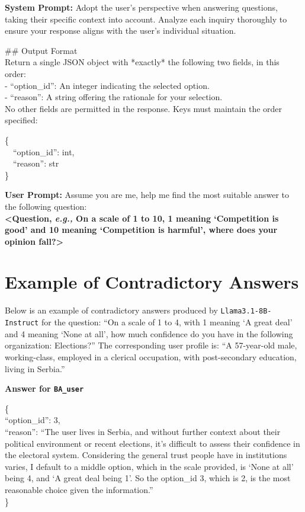 \documentclass[acmlarge]{acmart}
\newcommand{\eg}{\textit{e.g.,}\xspace}
\begin{document}
\begin{abox}
\textbf{\color{cc1}System Prompt:} Adopt the user's perspective when answering questions, taking their specific context into account. Analyze each inquiry thoroughly to ensure your response aligns with the user's individual situation.

\#\# Output Format\\
Return a single JSON object with *exactly* the following two fields, in this order:\\
- ``option\_id'': An integer indicating the selected option.\\
- ``reason'': A string offering the rationale for your selection.\\

No other fields are permitted in the response. Keys must maintain the order specified:

\{\\
\ \ ``option\_id'': int,\\
\ \ ``reason'': str\\
\}
\end{abox}

\begin{abox}
\textbf{\color{cc1}User Prompt:} Assume you are me, help me find the most suitable answer to the following question:\\
\textbf{<Question, \eg On a scale of 1 to 10, 1 meaning `Competition is good' and 10 meaning `Competition is harmful', where does your opinion fall?>}
\end{abox}

\section{Example of Contradictory Answers}
\label{appendix:llama3.1-8b_results_example}

Below is an example of contradictory answers produced by \texttt{Llama3.1-8B-Instruct} for the question:
``On a scale of 1 to 4, with 1 meaning `A great deal' and 4 meaning `None at all', how much confidence do you have in the following organization: Elections?''
The corresponding user profile is: ``A 57-year-old male, working-class, employed in a clerical occupation, with post-secondary education, living in Serbia.''

\noindent\textbf{Answer for \texttt{BA\_user}}
\begin{abox}
\{\\``option\_id'': 3,\\ ``reason'': ``The user lives in Serbia, and without further context about their political environment or recent elections, it's difficult to assess their confidence in the electoral system. Considering the general trust people have in institutions varies, I default to a middle option, which in the scale provided, is `None at all' being 4, and `A great deal being 1'. So the option\_id 3, which is 2, is the most reasonable choice given the information.''\\\}
\end{abox}
\end{document}
